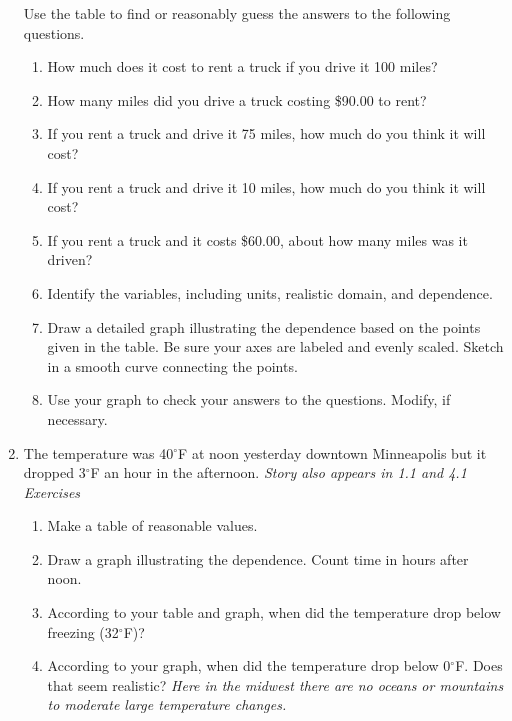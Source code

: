 \begin{enumerate}
Use the table to find or reasonably guess the answers to the following questions.
\begin{enumerate}
\item How much does it cost to rent a truck if you drive it 100 miles?
\item How many miles did you drive a truck costing \$90.00 to rent?
\item If you rent a truck and drive it 75 miles, how much do you think it will cost?
\item If you rent a truck and drive it 10 miles, how much do you think it will cost?
\item If you rent a truck and it costs \$60.00, about how many miles was it driven?
\item Identify the variables, including units, realistic domain, and dependence.
\item Draw a detailed graph illustrating the dependence based on the points given in the table.  Be sure your axes are labeled and evenly scaled.  Sketch in a smooth curve connecting the points.
\item Use your graph to check your answers to the questions.  Modify,  if necessary.
\end{enumerate}  

\item The temperature was 40$^\circ$F at noon yesterday downtown Minneapolis but it dropped 3$^\circ$F an hour in the afternoon.    \hfill \emph{Story also appears in 1.1 and 4.1 Exercises}
\begin{enumerate}
\item Make a table of reasonable values.
\item Draw a graph illustrating the dependence.  Count time in hours after noon.
\item According to your table and graph, when did the temperature drop below freezing (32$^\circ$F)?
\item According to your graph, when did the temperature drop below 0$^\circ$F.  Does that seem realistic?  \emph{Here in the midwest there are no oceans or mountains to moderate large temperature changes.}
\end{enumerate} 


\end{enumerate}
